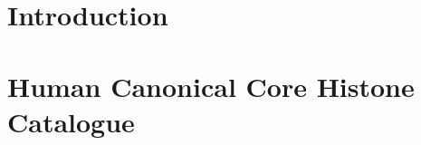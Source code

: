 \documentclass[a4paper,twoside,openright,draft]{memoir}
\begin{document}
  \mainmatter

  \chapter{Introduction}

  
  

  \chapter{Human Canonical Core Histone Catalogue}

  
  
  
  

  \backmatter

  
\end{document}
